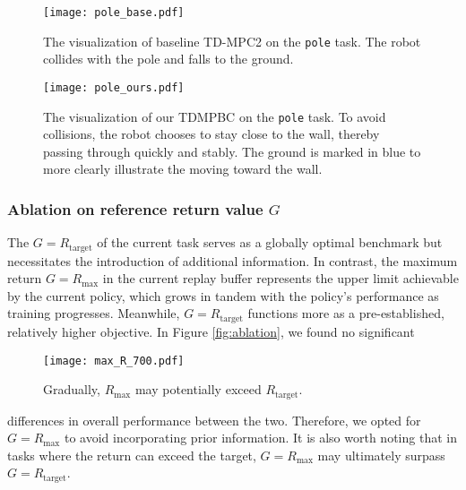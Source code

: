 \begin{figure*}[htbp]
  \centering
  \hspace{-4.5pt}
    \texttt{[image: pole\_base.pdf]}
    \caption{The visualization of baseline TD-MPC2 on the \texttt{pole} task. The robot collides with the pole and falls to the ground.}
    \label{fig:pole_base}
  \hspace{-6pt}
    \texttt{[image: pole\_ours.pdf]}
  \caption{The visualization of our TDMPBC on the \texttt{pole} task. To avoid collisions, the robot chooses to stay close to the wall, thereby passing through quickly and stably. The ground is marked in blue to more clearly illustrate the moving toward the wall.}
  \label{fig:pole_ours}
  \vspace{-8pt}
\end{figure*}
\subsubsection{Ablation on reference return value $G$}
The $G = R_{\text{target}}$ of the current task serves as a globally optimal benchmark but necessitates the introduction of additional information. In contrast, the maximum return $G = R_{\text{max}}$ in the current replay buffer represents the upper limit achievable by the current policy, which grows in tandem with the policy's performance as training progresses.
Meanwhile, $G = R_{\text{target}}$
functions more as a pre-established, relatively higher objective. 
In Figure \ref{fig:ablation}, we found no significant 
\begin{wrapfigure}[10]{r}{0.5\linewidth}
\vspace{-0.5cm}
\centering
\hspace{-8pt}
\texttt{[image: max\_R\_700.pdf]}
\vspace{-0.6cm}
\caption{Gradually, $R_{\text{max}}$ may potentially exceed $R_{\text{target}}$.}
    \vspace{-0.4cm}
\end{wrapfigure}
differences in overall performance between the two. 
Therefore, we opted for $G = R_{\text{max}}$ to avoid incorporating prior information. 
It is also worth noting that in tasks where the return can exceed the target, $G = R_{\text{max}}$ may ultimately surpass $G = R_{\text{target}}$.


